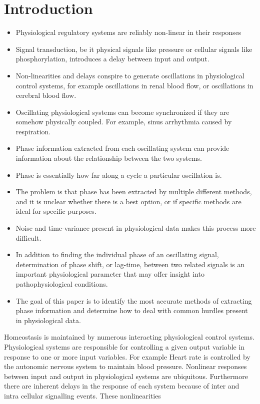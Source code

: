 \documentclass{article}
\begin{document}
\section*{Introduction}
\begin{itemize}
\item Physiological regulatory systems are reliably non-linear in their responses
\item Signal transduction, be it physical signals like pressure or cellular signals like phosphorylation, introduces a delay between input and output. 
\item Non-linearities and delays \cite{ottesen_modelling_1997} conspire to generate oscillations in physiological control systems, for example oscillations in renal blood flow, or oscillations in cerebral blood flow.
\item Oscillating physiological systems can become synchronized if they are somehow physically coupled. For example, sinus arrhythmia caused by respiration. 
\item Phase information extracted from each oscillating system can provide information about the relationship between the two systems.
\item Phase is essentially how far along a cycle a particular oscillation is. 
\item The problem is that phase has been extracted by multiple different methods, and it is unclear whether there is a best option, or if specific methods are ideal for specific purposes.
\item Noise and time-variance present in physiological data makes this process more difficult.

\item In addition to finding the individual phase of an oscillating signal, determination of phase shift, or lag-time, between two related signals is an important physiological parameter that may offer insight into pathophysiological conditions.  
\item The goal of this paper is to identify the most accurate methods of extracting phase information and determine how to deal with common hurdles present in physiological data.
\end{itemize}

Homeostasis is maintained by numerous interacting physiological control systems. Physiological systems are responsible for controlling a given output variable in response to one or more input variables. For example Heart rate is controlled by the autonomic nervous system to maintain blood pressure. Nonlinear responses between input and output in physiological systems are ubiquitous. Furthermore there are inherent delays in the response of each system because of inter and intra cellular signalling events. These nonlinearities
\end{document}
